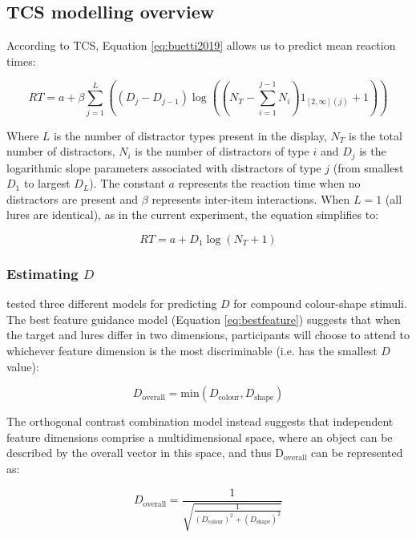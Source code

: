 \documentclass[smallextended]{svjour3}       %
\begin{document}
\subsection{TCS modelling overview} 

According to TCS, Equation \ref{eq:buetti2019} allows us to predict mean reaction times:

\begin{equation}
RT = a + \beta\sum_{j=1}^L\left((D_j - D_{j-1})\log\left(\left(N_T - \sum_{i=1}^{j-1}N_i\right)1_{[2,\infty](j)}+1 \right)\right)
\label{eq:buetti2019}
\end{equation}

Where $L$ is the number of distractor types present in the display, $N_T$ is the total number of distractors, $N_i$ is the number of distractors of type $i$ and $D_j$ is the logarithmic slope parameters associated with distractors of type $j$ (from smallest $D_1$ to largest $D_L$). The constant $a$ represents the reaction time when no distractors are present and $\beta$ represents inter-item interactions. When $L=1$ (all lures are identical), as in the current experiment, the equation simplifies to:

\begin{equation}
RT = a + D_1\log(N_T+1)
\end{equation}

\subsubsection{Estimating $D$}

\cite{buetti2019predicting} tested three different models for predicting $D$ for compound colour-shape stimuli. The best feature guidance model (Equation \ref{eq:bestfeature}) suggests that when the target and lures differ in two dimensions, participants will choose to attend to whichever feature dimension is the most discriminable (i.e. has the smallest $D$ value):

\begin{equation}
D_\text{overall} = \text{min}\left(D_\text{colour}, D_\text{shape}\right)
\label{eq:bestfeature}
\end{equation}

The orthogonal contrast combination model instead suggests that independent feature dimensions comprise a multidimensional space, where an object can be described by the overall vector in this space, and thus $\mathrm{D_{overall}}$ can be represented as:

\begin{equation}
D_\text{overall} = \frac{1}{\sqrt{\frac{1}{(D_\text{colour})^2 + (D_\text{shape})^2}}}
\label{eq:orthogonalcontrast}
\end{equation}
\end{document}
